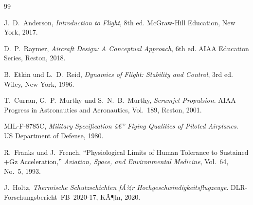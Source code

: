 ﻿\documentclass[12pt,a4paper]{article}
\theoremstyle{plain}
\theoremstyle{definition}
\theoremstyle{remark}
\begin{document}
\printnomenclature

\begin{thebibliography}{99}

J.~D.~Anderson,
\textit{Introduction to Flight}, 8th ed.
McGraw-Hill Education, New York, 2017.

D.~P.~Raymer,
\textit{Aircraft Design: A Conceptual Approach}, 6th ed.
AIAA Education Series, Reston, 2018.

B.~Etkin und L.~D.~Reid,
\textit{Dynamics of Flight: Stability and Control}, 3rd ed.
Wiley, New York, 1996.

T.~Curran, G.~P.~Murthy und S.~N.~B.~Murthy,
\textit{Scramjet Propulsion}.
AIAA Progress in Astronautics and Aeronautics, Vol.~189, Reston, 2001.

MIL-F-8785C,
\textit{Military Specification â€” Flying Qualities of Piloted Airplanes}.
US Department of Defense, 1980.

R.~Franks und J.~French,
``Physiological Limits of Human Tolerance to Sustained +Gz Acceleration,''
\textit{Aviation, Space, and Environmental Medicine}, Vol.~64, No.~5, 1993.

J.~Holtz,
\textit{Thermische Schutzschichten fÃ¼r Hochgeschwindigkeitsflugzeuge}.
DLR-Forschungsbericht~FB~2020-17, KÃ¶ln, 2020.

\end{thebibliography}
\end{document}
